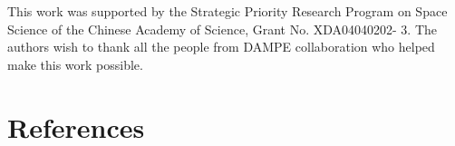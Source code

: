 \documentclass[5p, times]{elsarticle}
\begin{document}
This work was supported by the Strategic Priority Research Program on Space Science of the Chinese Academy of Science,
Grant No. XDA04040202- 3. The authors wish to thank all the people from DAMPE collaboration who helped make this work
possible.

\section*{References}
\label{sec:reference}



\end{document}
